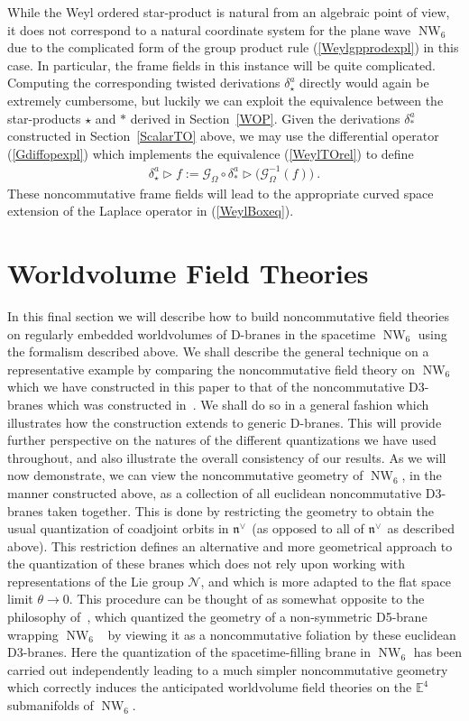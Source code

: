 \documentclass[11pt,a4paper]{article}
\DeclareMathOperator{\NW}{NW}
\newcommand{\1}{\mathbb{1}}
\def\mfn{{\mathfrak n}}
\newcommand{\newsection}{\setcounter{equation}{0}\section}
\newcommand{\eucl}{{\mathbb E}}
\newcommand{\beq}{\begin{eqnarray}}
\newcommand{\eeq}{\end{eqnarray}}
\begin{document}
While the Weyl ordered star-product is natural from an algebraic point
of view, it does not correspond to a natural coordinate system for the
plane wave $\NW_6$ due to the complicated form of the group product
rule (\ref{Weylgpprodexpl}) in this case. In particular, the frame
fields in this instance will be quite complicated. Computing the
corresponding twisted derivations $\delta^a_\star$ directly would
again be extremely cumbersome, but luckily we can exploit the
equivalence between the star-products $\star$ and $*$ derived in
Section~\ref{WOP}. Given the derivations $\delta^a_*$ constructed in
Section~\ref{ScalarTO} above, we may use the differential operator
(\ref{Gdiffopexpl}) which implements the equivalence (\ref{WeylTOrel})
to define
\beq
\delta^a_\star\triangleright f:=\mathcal{G}^{~}_\Omega\circ
\delta^a_*\triangleright\bigl(\mathcal{G}_\Omega^{-1}(f)\bigr) \ .
\label{Weyldelta}\eeq
These noncommutative frame fields will lead to the appropriate curved
space extension of the Laplace operator in (\ref{WeylBoxeq}).

\newsection{Worldvolume Field Theories\label{D3Branes}}

In this final section we will describe how to build noncommutative
field theories on regularly embedded worldvolumes of D-branes in the
spacetime $\NW_6$ using the formalism described above. We shall
describe the general technique on a representative example by
comparing the noncommutative field theory on $\NW_6$ which we have
constructed in this paper to that of the noncommutative D3-branes
which was constructed in~\cite{HSz1}. We shall do so in a general
fashion which illustrates how the construction extends to generic
D-branes. This will provide further perspective on the natures of the different
quantizations we have used throughout, and also illustrate the overall
consistency of our results. As we will now demonstrate, we can view
the noncommutative geometry of $\NW_6$, in the manner constructed
above, as a collection of all euclidean noncommutative D3-branes taken
together. This is done by restricting the geometry to obtain the usual
quantization of coadjoint orbits in $\mfn^{\vee\,}$ (as opposed to all of
$\mfn^{\vee\,}$ as described above). This restriction defines an alternative
and more geometrical approach to the quantization of these branes which
does not rely upon working with representations of the Lie group
$\mathcal{N}$, and which is more adapted to the flat space limit
$\theta\to0$. This procedure can be thought of as somewhat opposite to
the philosophy of~\cite{HSz1}, which quantized the geometry of a
non-symmetric D5-brane wrapping $\NW_6$~\cite{KNSanjay1} by viewing it as a
noncommutative foliation by these euclidean D3-branes. Here the
quantization of the spacetime-filling brane in $\NW_6$ has been
carried out independently leading to a much simpler noncommutative
geometry which correctly induces the anticipated worldvolume field
theories on the $\eucl^4$ submanifolds of $\NW_6$.
\end{document}
